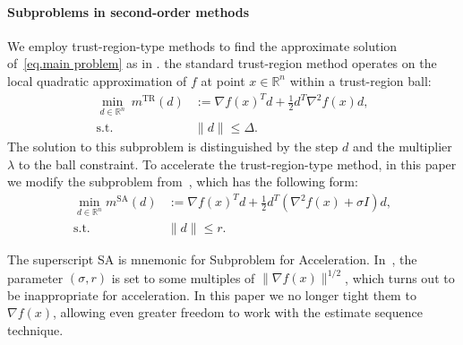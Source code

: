 \documentclass{article}
\theoremstyle{plain}
\theoremstyle{definition}
\theoremstyle{remark}
\begin{document}
\paragraph{Subproblems in second-order methods}
We employ trust-region-type methods to find the approximate solution of~\eqref{eq.main problem} as in .
the standard trust-region method \cite{conn2000trust} operates on the local quadratic approximation of $f$ at point $x\in\mathbb{R}^n$ within a trust-region ball:
\begin{equation}
    \label{eq.classic tr subproblem} \begin{aligned} \min_{d \in \mathbb{R}^n} \   m^{\text{TR}}(d) & := \nabla f(x)^T d+\tfrac{1}{2}d^T \nabla^2 f(x) d, \\ \operatorname{s.t.} \ &\|d\|\le \Delta.
    \end{aligned}
\end{equation}
The solution to this subproblem is distinguished by the step $d$ and the multiplier $\lambda$ to the ball constraint.
To accelerate the trust-region-type method, in this paper we modify the subproblem from~\citet{jiang2024nonconvexityuniversaltrustregionmethod}, which has the following form:
\begin{subequations}\label{eq.newTR}
    \begin{align}
        \min_{d \in \mathbb{R}^n} m^{\text{SA}}(d) & :=\nabla f(x)^T d + \tfrac{1}{2}d^T (\nabla^2 f(x) + \sigma I) d, \\\label{eq.sa.ballconstraint} \operatorname{s.t.} ~& \|d\| \le r.
    \end{align}
\end{subequations}

The superscript \textrm{SA} is mnemonic for Subproblem for Acceleration.
In~\citet{jiang2024nonconvexityuniversaltrustregionmethod}, the parameter $(\sigma, r)$ is set to some multiples of $\|\nabla f(x)\|^{1/2}$, which turns out to be inappropriate for acceleration. In this paper we no longer tight them to $\nabla f(x)$, allowing even greater freedom to work with the estimate sequence technique.
\end{document}
